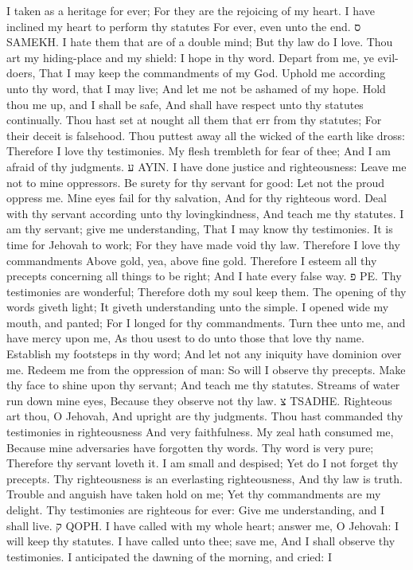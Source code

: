I taken as a heritage for ever; For they are the rejoicing of my heart.  I have inclined my heart to perform thy statutes For ever, even unto the end. ס SAMEKH.  I hate them that are of a double mind; But thy law do I love.  Thou art my hiding-place and my shield: I hope in thy word.  Depart from me, ye evil-doers, That I may keep the commandments of my God.  Uphold me according unto thy word, that I may live; And let me not be ashamed of my hope.  Hold thou me up, and I shall be safe, And shall have respect unto thy statutes continually.  Thou hast set at nought all them that err from thy statutes; For their deceit is falsehood.  Thou puttest away all the wicked of the earth like dross: Therefore I love thy testimonies.  My flesh trembleth for fear of thee; And I am afraid of thy judgments. ע AYIN.  I have done justice and righteousness: Leave me not to mine oppressors.  Be surety for thy servant for good: Let not the proud oppress me.  Mine eyes fail for thy salvation, And for thy righteous word.  Deal with thy servant according unto thy lovingkindness, And teach me thy statutes.  I am thy servant; give me understanding, That I may know thy testimonies.  It is time for Jehovah to work; For they have made void thy law.  Therefore I love thy commandments Above gold, yea, above fine gold.  Therefore I esteem all thy precepts concerning all things to be right; And I hate every false way. פ PE.  Thy testimonies are wonderful; Therefore doth my soul keep them.  The opening of thy words giveth light; It giveth understanding unto the simple.  I opened wide my mouth, and panted; For I longed for thy commandments.  Turn thee unto me, and have mercy upon me, As thou usest to do unto those that love thy name.  Establish my footsteps in thy word; And let not any iniquity have dominion over me.  Redeem me from the oppression of man: So will I observe thy precepts.  Make thy face to shine upon thy servant; And teach me thy statutes.  Streams of water run down mine eyes, Because they observe not thy law. צ TSADHE.  Righteous art thou, O Jehovah, And upright are thy judgments.  Thou hast commanded thy testimonies in righteousness And very faithfulness.  My zeal hath consumed me, Because mine adversaries have forgotten thy words.  Thy word is very pure; Therefore thy servant loveth it.  I am small and despised; Yet do I not forget thy precepts.  Thy righteousness is an everlasting righteousness, And thy law is truth.  Trouble and anguish have taken hold on me; Yet thy commandments are my delight.  Thy testimonies are righteous for ever: Give me understanding, and I shall live. ק QOPH.  I have called with my whole heart; answer me, O Jehovah: I will keep thy statutes.  I have called unto thee; save me, And I shall observe thy testimonies.  I anticipated the dawning of the morning, and cried: I 